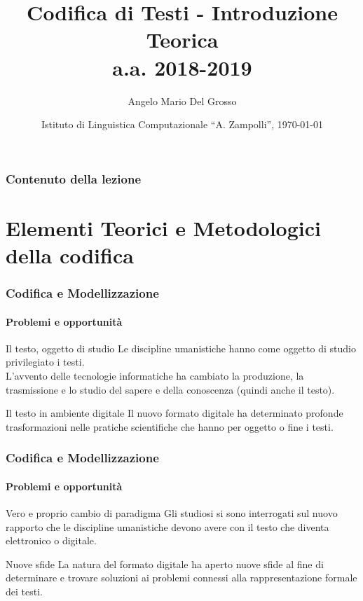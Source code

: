 \documentclass{beamer}
\title{Codifica di Testi - Introduzione Teorica \\a.a. 2018-2019}
\author[A.M. Del Grosso]{Angelo Mario Del Grosso}
\institute{\texttt{angelo.delgrosso@ilc.cnr.it} \\\bigskip\textit{CNR-ILC-LicoLab}}
\date{Istituto di Linguistica Computazionale ``A. Zampolli'', \today}
\begin{document}
\begin{frame}
	\maketitle
\end{frame}

\begin{frame}
	\frametitle{Contenuto della lezione}
	\tableofcontents
\end{frame}

\section{Elementi Teorici e Metodologici della codifica}
\begin{frame}
	\frametitle{Codifica e Modellizzazione}
	\framesubtitle{Problemi e opportunità}
	\addtocounter{nframe}{1}

	\begin{block}{Il testo, oggetto di studio}
		Le discipline umanistiche hanno come oggetto di studio privilegiato i testi.
		\\ L'avvento delle tecnologie informatiche ha cambiato la produzione, la trasmissione e lo studio del sapere e della conoscenza (quindi anche il testo).
	\end{block}

	\begin{block}{Il testo in ambiente digitale}
		Il nuovo formato digitale ha determinato profonde trasformazioni nelle pratiche scientifiche che hanno per oggetto o fine i testi.
	\end{block}


\end{frame}

\begin{frame}
	\frametitle{Codifica e Modellizzazione}
	\framesubtitle{Problemi e opportunità}
	\addtocounter{nframe}{1}

	\begin{block}{Vero e proprio cambio di paradigma}
		Gli studiosi si sono interrogati sul nuovo rapporto che le discipline umanistiche devono avere con il testo che diventa elettronico o digitale.
	\end{block}

	\begin{block}{Nuove sfide}
		La natura del formato digitale ha aperto nuove sfide  al fine di determinare e trovare soluzioni ai problemi connessi alla rappresentazione formale dei testi.
	\end{block}


\end{frame}
\end{document}

